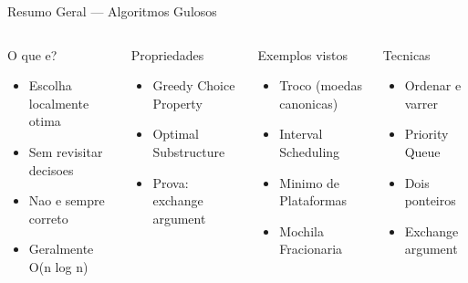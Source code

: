 \documentclass[aspectratio=169,10pt]{beamer}
\begin{document}
\begin{frame}[shrink=2]{Resumo Geral --- Algoritmos Gulosos}
  \begin{columns}[t]
      \begin{block}{O que e?}
        \begin{itemize}\footnotesize
          \item Escolha localmente otima
          \item Sem revisitar decisoes
          \item Nao e sempre correto
          \item Geralmente O(n log n)
        \end{itemize}
      \end{block}
      \vspace{0.1cm}
      \begin{block}{Propriedades}
        \begin{itemize}\footnotesize
          \item Greedy Choice Property
          \item Optimal Substructure
          \item Prova: exchange argument
        \end{itemize}
      \end{block}
      \begin{block}{Exemplos vistos}
        \begin{itemize}\footnotesize
          \item Troco (moedas canonicas)
          \item Interval Scheduling
          \item Minimo de Plataformas
          \item Mochila Fracionaria
        \end{itemize}
      \end{block}
      \vspace{0.1cm}
      \begin{block}{Tecnicas}
        \begin{itemize}\footnotesize
          \item Ordenar e varrer
          \item Priority Queue
          \item Dois ponteiros
          \item Exchange argument
        \end{itemize}
      \end{block}

\end{columns}
\end{frame}
\end{document}
